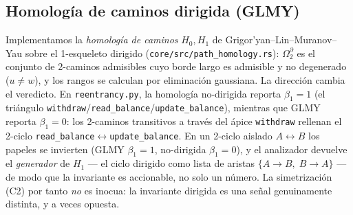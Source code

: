 \documentclass[11pt]{article}
\begin{document}
\subsection{Homología de caminos dirigida (GLMY)}
Implementamos la \emph{homología de caminos} $H_0,H_1$ de
Grigor'yan--Lin--Muranov--Yau sobre el 1-esqueleto dirigido
(\texttt{core/src/path\_homology.rs}): $\Omega_2^\partial$ es el conjunto de
2-caminos admisibles cuyo borde largo es admisible y no degenerado ($u\neq w$), y
los rangos se calculan por eliminación gaussiana. La dirección cambia el
veredicto. En \texttt{reentrancy.py}, la homología no-dirigida reporta
$\beta_1=1$ (el triángulo
\texttt{withdraw}/\texttt{read\_balance}/\texttt{update\_balance}), mientras que
GLMY reporta $\beta_1=0$: los 2-caminos transitivos a través del ápice
\texttt{withdraw} rellenan el 2-ciclo
\texttt{read\_balance}$\leftrightarrow$\texttt{update\_balance}. En un 2-ciclo
aislado $A\leftrightarrow B$ los papeles se invierten (GLMY $\beta_1=1$,
no-dirigida $\beta_1=0$), y el analizador devuelve el \emph{generador} de $H_1$
--- el ciclo dirigido como lista de aristas $\{A\to B,\;B\to A\}$ --- de modo que
la invariante es accionable, no solo un número. La simetrización (C2) por tanto
\emph{no} es inocua: la invariante dirigida es una señal genuinamente distinta, y
a veces opuesta.
\end{document}
